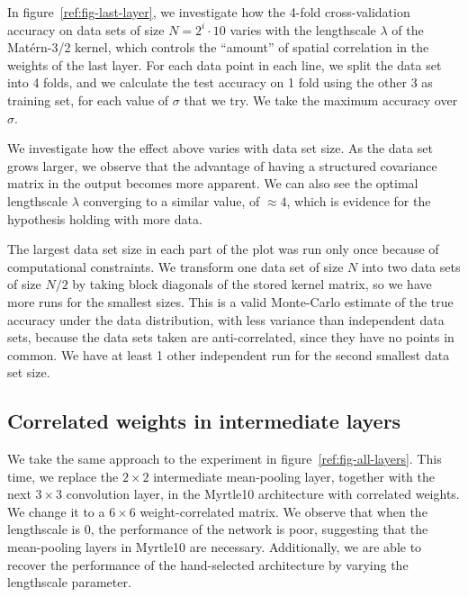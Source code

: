 \documentclass[tablecaption=bottom,wcp,nonatbib]{jmlr} %
\begin{document}
In figure~\ref{ref:fig-last-layer}, we investigate how the 4-fold cross-validation accuracy on data sets of size $N=2^i \cdot 10$ varies with the lengthscale $\lambda$ of the Matérn-3/2 kernel, which controls the ``amount'' of spatial correlation in the weights of the last layer. For each data point in each line, we split the data set into 4 folds, and we calculate the test accuracy on 1 fold using the other 3 as training set, for each value of $\sigma$ that we try. We take the maximum accuracy over $\sigma$.

We investigate how the effect above varies with data set size. As the data set grows larger, we observe that the advantage of having a structured covariance matrix in the output becomes more apparent. We can also see the optimal lengthscale $\lambda$ converging to a similar value, of $\approx 4$, which is evidence for the hypothesis holding with more data. 

The largest data set size in each part of the plot was run only once because of computational constraints. We transform one data set of size $N$ into two data sets of size $N/2$ by taking block diagonals of the stored kernel matrix, so we have more runs for the smallest sizes. This is a valid Monte-Carlo estimate of the true accuracy under the data distribution, with less variance than independent data sets, because the data sets taken are anti-correlated, since they have no points in common. We have at least 1 other independent run for the second smallest data set size.

\subsection{Correlated weights in intermediate layers}
We take the same approach to the experiment in figure~\ref{ref:fig-all-layers}. This time, we replace the $2\times 2$ intermediate mean-pooling layer, together with the next $3\times 3$ convolution layer, in the Myrtle10 architecture with correlated weights. We change it to a $6 \times 6$ weight-correlated matrix. We observe that when the lengthscale is 0, the performance of the network is poor, suggesting that the mean-pooling layers in Myrtle10 are necessary. Additionally, we are able to recover the performance of the hand-selected architecture by varying the lengthscale parameter.
\end{document}
